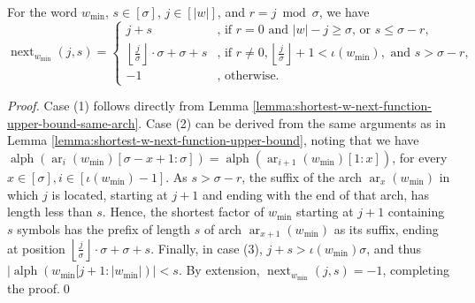 \documentclass[runningheads,UKenglish,cleveref, autoref, thm-restate]{llncs}
\DeclareMathOperator{\arch}{ar}
\DeclareMathOperator{\alphabet}{alph}
\DeclareMathOperator{\nextAlphPos}{next}
\newif\ifpaper
\begin{document}
\begin{lemma}\label{lemma:next-function-min-word-properties}
    For the word $w_{\min}$, $s\in[\sigma]$, $j\in[|w|]$, and $r = j\bmod\sigma$, we have
    $$ \nextAlphPos_{w_{\min}}(j, s) = 
    \begin{cases}  
        j+s     & \text{, if } r = 0\text{ and } |w|-j \geq \sigma \text{, or } s \leq \sigma-r, \\
        \left\lfloor\frac{j}{\sigma}\right\rfloor\cdot\sigma + \sigma + s    & \text{, if } r \neq 0, \left\lfloor\frac{j}{\sigma}\right\rfloor+1 < \iota(w_{\min}), \text{ and } s > \sigma-r,\\
        -1 & \text{, otherwise.}
    \end{cases}$$
\end{lemma}
\ifpaper
\else
\begin{proof}
	Case (1) follows directly from Lemma \ref{lemma:shortest-w-next-function-upper-bound-same-arch}.
	Case (2) can be derived from the same arguments as in Lemma \ref{lemma:shortest-w-next-function-upper-bound},  noting that we have $\alphabet(\arch_i(w_{\min})[\sigma - x + 1: \sigma]) = \alphabet(\arch_{i + 1}(w_{\min})[1 : x])$, for every $x \in [\sigma], i \in [\iota(w_{\min})-1]$. As $s > \sigma-r$, the suffix of the arch $\arch_{x}(w_{\min})$ in which $j$ is located, starting at $j+1$ and ending with the end of that arch, has length less than $s$. Hence, the shortest factor of $w_{\min}$ starting at $j + 1$ containing $s$ symbols has the prefix of length $s$ of arch $\arch_{x + 1}(w_{\min})$ as its suffix, ending at position $\left\lfloor\frac{j}{\sigma}\right\rfloor\cdot\sigma + \sigma + s$. Finally, in case (3), $j + s > \iota(w_{\min}) \sigma$, and thus $\vert \alphabet(w_{\min}[j + 1 : \vert w_{\min} \vert) \vert < s$. By extension, $\nextAlphPos_{w_{\min}}(j, s) = -1$, completing the proof.\qed
\end{proof}
\fi
\end{document}
